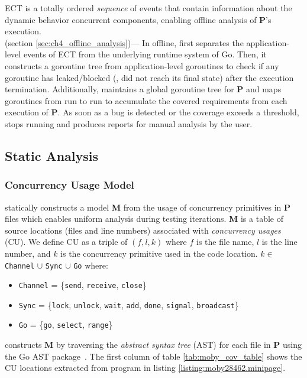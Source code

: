 %
ECT is a totally ordered \textit{sequence} of events that contain information about the dynamic behavior concurrent components, enabling offline analysis of \textbf{P}'s execution.
\\
 (section \ref{sec:ch4_offline_analysis})---
In offline, \goat first separates the application-level events of ECT from the underlying runtime system of Go.
%
Then, it constructs a goroutine tree from application-level goroutines to check if any goroutine has leaked/blocked (\ie, did not reach its final state) after the execution termination.
%
Additionally, \goat maintains a global goroutine tree for \textbf{P} and maps goroutines from run to run to accumulate the covered requirements from each execution of \textbf{P}.
%
As soon as a bug is detected or the coverage exceeds a threshold, \goat stops running and produces reports for manual analysis by the user.
%

\subsection{Static Analysis}
\label{sec:ch4_static_analysis}

\subsubsection{Concurrency Usage Model}
\goat statically constructs a model \textbf{M} from the usage of concurrency primitives in \textbf{P} files which enables uniform analysis during testing iterations.
%
\textbf{M} is a table of source locations (files and line numbers) associated with \textit{concurrency usages} (CU).
%
We define CU as a triple of $(f,l,k)$ where $f$ is the file name, $l$ is the line number, and $k$ is the concurrency primitive used in the code location.
$k\in$ \texttt{Channel} $\cup$ \texttt{Sync} $\cup$ \texttt{Go} where:
\begin{itemize}
  \item \texttt{Channel} = \{\texttt{send}, \texttt{receive}, \texttt{close}\}
  \item \texttt{Sync} = \{\texttt{lock}, \texttt{unlock}, \texttt{wait}, \texttt{add}, \texttt{done}, \texttt{signal}, \texttt{broadcast}\}
  \item \texttt{Go} = \{\texttt{go}, \texttt{select}, \texttt{range}\}
\end{itemize}

\goat constructs \textbf{M} by traversing the \textit{abstract syntax tree} (AST) for each file in \textbf{P} using the Go AST package~\cite{go-package-ast}.
%
The first column of table \ref{tab:moby_cov_table} shows the CU locations extracted from program in listing \ref{listing:moby28462.minipage}.


